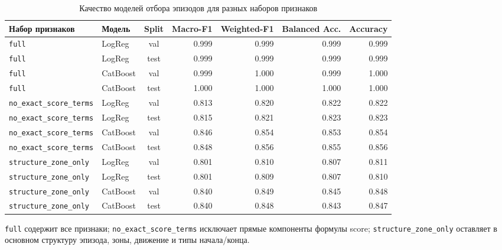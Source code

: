 \begin{table}[H]
\centering
\small
\caption{Качество моделей отбора эпизодов для разных наборов признаков}
\label{tab:model-results}
\begin{threeparttable}
\begin{tabular}{llcrrrr}
\toprule
Набор признаков & Модель & Split & Macro-F1 & Weighted-F1 & Balanced Acc. & Accuracy \\
\midrule
\texttt{full} & LogReg & val & 0.999 & 0.999 & 0.999 & 0.999 \\
\texttt{full} & LogReg & test & 0.999 & 0.999 & 0.999 & 0.999 \\
\texttt{full} & CatBoost & val & 0.999 & 1.000 & 0.999 & 1.000 \\
\texttt{full} & CatBoost & test & 1.000 & 1.000 & 1.000 & 1.000 \\
\texttt{no\_exact\_score\_terms} & LogReg & val & 0.813 & 0.820 & 0.822 & 0.822 \\
\texttt{no\_exact\_score\_terms} & LogReg & test & 0.815 & 0.821 & 0.823 & 0.823 \\
\texttt{no\_exact\_score\_terms} & CatBoost & val & 0.846 & 0.854 & 0.853 & 0.854 \\
\texttt{no\_exact\_score\_terms} & CatBoost & test & 0.848 & 0.856 & 0.855 & 0.856 \\
\texttt{structure\_zone\_only} & LogReg & val & 0.801 & 0.810 & 0.807 & 0.811 \\
\texttt{structure\_zone\_only} & LogReg & test & 0.801 & 0.809 & 0.807 & 0.810 \\
\texttt{structure\_zone\_only} & CatBoost & val & 0.840 & 0.849 & 0.845 & 0.848 \\
\texttt{structure\_zone\_only} & CatBoost & test & 0.840 & 0.848 & 0.843 & 0.847 \\
\bottomrule
\end{tabular}
\begin{tablenotes}\footnotesize
\item \texttt{full} содержит все признаки; \texttt{no\_exact\_score\_terms} исключает прямые компоненты формулы score; \texttt{structure\_zone\_only} оставляет в основном структуру эпизода, зоны, движение и типы начала/конца.
\end{tablenotes}
\end{threeparttable}
\end{table}
